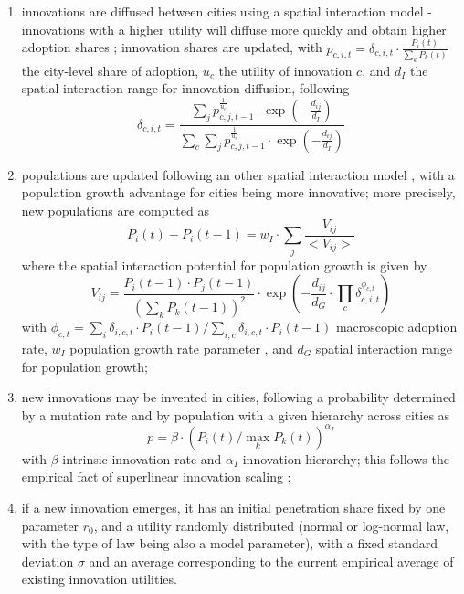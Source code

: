 \documentclass[final,5p,times,twocolumn,authoryear]{elsarticle}
\begin{document}
\begin{enumerate}
	\item innovations are diffused between cities using a spatial interaction model - innovations with a higher utility will diffuse more quickly and obtain higher adoption shares \citep{hagerstrand1968innovation}; innovation shares are updated, with $p_{c,i,t} = \delta_{c,i,t} \cdot \frac{P_{i}(t)}{\sum_k P_k (t)}$ the city-level share of adoption, $u_c$ the utility of innovation $c$, and $d_I$ the spatial interaction range for innovation diffusion, following
        \begin{equation}
            \delta_{c,i,t} = \frac{\sum_j p_{c,j,t-1}^{\frac{1}{u_c}} \cdot \exp{(-\frac{d_{ij}}{d_I})}}{\sum_c \sum_j p_{c,j,t-1}^{\frac{1}{u_c}} \cdot \exp{(-\frac{d_{ij}}{d_I})}}
        \end{equation}
	\item populations are updated following an other spatial interaction model \citep{raimbault2020indirect}, with a population growth advantage for cities being more innovative; more precisely, new populations are computed as 
    	\begin{equation}
	        P_i(t) - P_i(t-1) = w_I\cdot \sum_j \frac{V_{ij}}{<V_{ij}>}
	    \end{equation}
	where the spatial interaction potential for population growth is given by 
	    \begin{equation}
            V_{ij}= \frac{P_{i}(t-1) \cdot P_{j}(t-1)}{(\sum_k P_k(t-1))^2} \cdot \exp{\left(-\frac{d_{ij}}{d_G} \cdot \prod_c \delta_{c,i,t}^{\phi_{c,t}}\right)}
        \end{equation}
    with $\phi_{c,t} = \sum_i \delta_{i,c,t}\cdot P_i(t-1) /\sum_{i,c} \delta_{i,c,t}\cdot P_{i}(t-1)$ macroscopic adoption rate, $w_I$ population growth rate parameter , and $d_G$ spatial interaction range for population growth;
	\item new innovations may be invented in cities, following a probability determined by a mutation rate and by population with a given hierarchy across cities as
	    \begin{equation}
	        p = \beta \cdot \left(P_i (t) / \max_k P_k (t)\right)^{\alpha_I}
	    \end{equation}
	with $\beta$ intrinsic innovation rate and $\alpha_I$ innovation hierarchy; this follows the empirical fact of superlinear innovation scaling \citep{arbesman2009superlinear};
	\item if a new innovation emerges, it has an initial penetration share fixed by one parameter $r_0$, and a utility randomly distributed (normal or log-normal law, with the type of law being also a model parameter), with a fixed standard deviation $\sigma$ and an average corresponding to the current empirical average of existing innovation utilities.
\end{enumerate}
\end{document}
